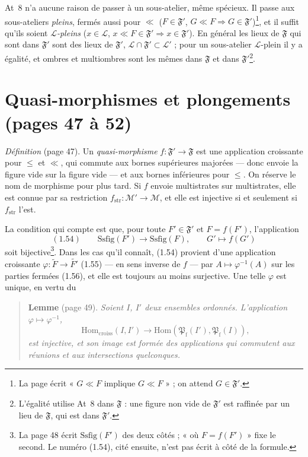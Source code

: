 \documentclass[11pt,a4paper]{article}
\begin{document}
At~8 n'a aucune raison de passer à un sous-atelier, même spécieux. Il passe aux
sous-ateliers \emph{pleins}, fermés aussi pour $\ll$ ($F \in \mathfrak{F}'$, $G
\ll F \Rightarrow G \in \mathfrak{F}'$)\footnote{La page écrit « $G \ll F$
implique $G \ll F$ » ; on attend $G \in \mathfrak{F}'$.}, et il suffit qu'ils
soient \emph{$\mathcal{L}$-pleins} ($x \in \mathcal{L}$, $x \ll F \in
\mathfrak{F}' \Rightarrow x \in \mathfrak{F}'$). En général les lieux de
$\mathfrak{F}$ qui sont dans $\mathfrak{F}'$ sont des lieux de $\mathfrak{F}'$,
$\mathcal{L} \cap \mathfrak{F}' \subset \mathcal{L}'$ ; pour un sous-atelier
$\mathcal{L}$-plein il y a égalité, et ombres et multiombres sont les mêmes dans
$\mathfrak{F}$ et dans $\mathfrak{F}'$\footnote{L'égalité utilise At~8 dans
$\mathfrak{F}$ : une figure non vide de $\mathfrak{F}'$ est raffinée par un lieu
de $\mathfrak{F}$, qui est dans $\mathfrak{F}'$.}.

\section*{Quasi-morphismes et plongements (pages 47 à 52)}

\emph{Définition} (page 47). Un \emph{quasi-morphisme} $f : \mathfrak{F}' \to
\mathfrak{F}$ est une application croissante pour $\leq$ et $\ll$, qui commute
aux bornes supérieures majorées --- donc envoie la figure vide sur la figure
vide --- et aux bornes inférieures pour $\leq$. On réserve le nom de morphisme
pour plus tard. Si $f$ envoie multistrates sur multistrates, elle est connue par
sa restriction $f_{\mathrm{str}} : \mathcal{M}' \to \mathcal{M}$, et elle est
injective si et seulement si $f_{\mathrm{str}}$ l'est.

La condition qui compte est que, pour toute $F' \in \mathfrak{F}'$ et $F =
f(F')$, l'application
\[
(1.54) \qquad \mathrm{Ssfig}(F') \longrightarrow \mathrm{Ssfig}(F), \qquad G'
\longmapsto f(G')
\]
soit bijective\footnote{La page 48 écrit $\mathrm{Ssfig}(F')$ des deux côtés ;
« où $F = f(F')$ » fixe le second. Le numéro (1.54), cité ensuite, n'est pas
écrit à côté de la formule.}. Dans les cas qu'il connaît, (1.54) provient d'une
application croissante $\varphi : \widetilde{F} \to \widetilde{F'}$ (1.55) --- en
sens inverse de $f$ --- par $A \mapsto \varphi^{-1}(A)$ sur les parties fermées
(1.56), et elle est toujours au moins surjective. Une telle $\varphi$ est unique,
en vertu du

\begin{quote}
\textbf{Lemme} (page 49). \emph{Soient $I$, $I'$ deux ensembles ordonnés.
L'application $\varphi \mapsto \varphi^{-1}$,
\[
\mathrm{Hom}_{\mathrm{croiss}}(I, I') \longrightarrow
\mathrm{Hom}(\mathfrak{P}_{\mathrm{f}}(I'), \mathfrak{P}_{\mathrm{f}}(I)),
\]
est injective, et son image est formée des applications qui commutent aux
réunions et aux intersections quelconques.}
\end{quote}
\end{document}
